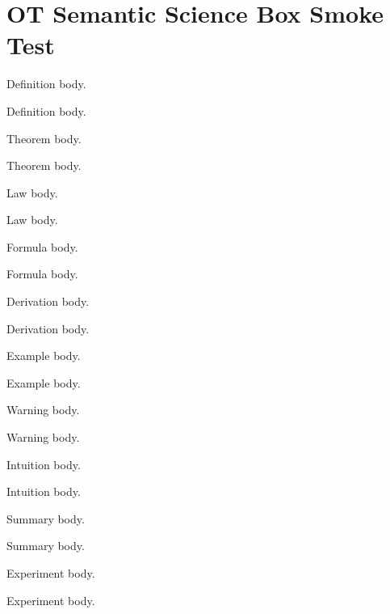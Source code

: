 \documentclass{article}
\begin{document}
\section*{OT Semantic Science Box Smoke Test}


\begin{definitionbox}Definition body.\end{definitionbox}
\begin{definitionboxnosplit}Definition body.\end{definitionboxnosplit}
\begin{theorembox}Theorem body.\end{theorembox}
\begin{theoremboxnosplit}Theorem body.\end{theoremboxnosplit}
\begin{lawbox}Law body.\end{lawbox}
\begin{lawboxnosplit}Law body.\end{lawboxnosplit}
\begin{formulabox}[Formula: $E = mc^2$]Formula body.\end{formulabox}
\begin{formulaboxnosplit}Formula body.\end{formulaboxnosplit}
\begin{derivationbox}Derivation body.\end{derivationbox}
\begin{derivationboxnosplit}Derivation body.\end{derivationboxnosplit}
\begin{examplebox}Example body.\end{examplebox}
\begin{exampleboxnosplit}Example body.\end{exampleboxnosplit}
\begin{warningbox}Warning body.\end{warningbox}
\begin{warningboxnosplit}Warning body.\end{warningboxnosplit}
\begin{intuitionbox}Intuition body.\end{intuitionbox}
\begin{intuitionboxnosplit}Intuition body.\end{intuitionboxnosplit}
\begin{summarybox}Summary body.\end{summarybox}
\begin{summaryboxnosplit}Summary body.\end{summaryboxnosplit}
\begin{experimentbox}Experiment body.\end{experimentbox}
\begin{experimentboxnosplit}Experiment body.\end{experimentboxnosplit}
\end{document}
